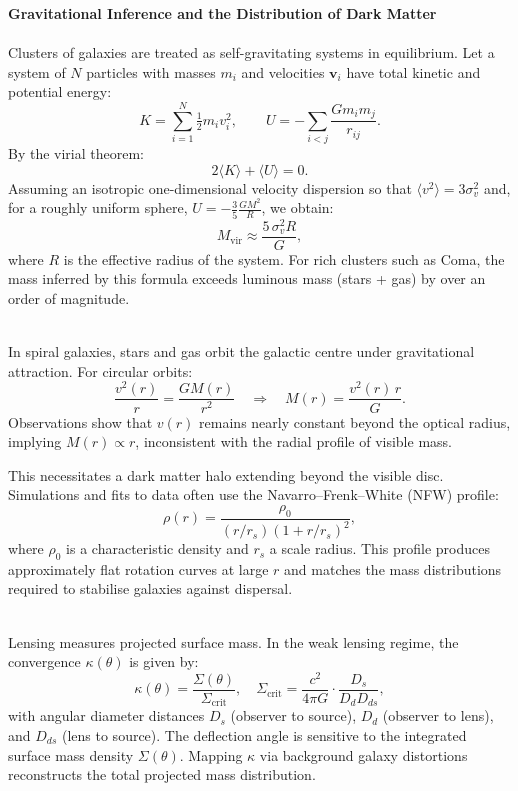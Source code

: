 \begin{technical}
{\Large\textbf{Gravitational Inference and the Distribution of Dark Matter}}\\[0.3em]

\\[0.25em]
Clusters of galaxies are treated as self-gravitating systems in equilibrium. Let a system of \( N \) particles with masses \( m_i \) and velocities \( \mathbf{v}_i \) have total kinetic and potential energy:
\[
K = \sum_{i=1}^N \tfrac{1}{2} m_i v_i^2, \qquad
U = - \sum_{i<j} \frac{G m_i m_j}{r_{ij}}.
\]
By the virial theorem:
\[
2\langle K \rangle + \langle U \rangle = 0.
\]
Assuming an isotropic one-dimensional velocity dispersion so that \( \langle v^2 \rangle = 3\sigma_v^2 \) and, for a roughly uniform sphere, \( U = - \tfrac{3}{5}\tfrac{G M^2}{R} \), we obtain:
\[
M_{\text{vir}} \approx \frac{5\,\sigma_v^2 R}{G},
\]
where \( R \) is the effective radius of the system. For rich clusters such as Coma, the mass inferred by this formula exceeds luminous mass (stars + gas) by over an order of magnitude.

\\[0.25em]
In spiral galaxies, stars and gas orbit the galactic centre under gravitational attraction. For circular orbits:
\[
\frac{v^2(r)}{r} = \frac{G M(r)}{r^2} \quad \Rightarrow \quad M(r) = \frac{v^2(r)\,r}{G}.
\]
Observations show that \( v(r) \) remains nearly constant beyond the optical radius, implying \( M(r) \propto r \), inconsistent with the radial profile of visible mass.

This necessitates a dark matter halo extending beyond the visible disc. Simulations and fits to data often use the Navarro–Frenk–White (NFW) profile:
\[
\rho(r) = \frac{\rho_0}{(r/r_s)(1 + r/r_s)^2},
\]
where \( \rho_0 \) is a characteristic density and \( r_s \) a scale radius. This profile produces approximately flat rotation curves at large \( r \) and matches the mass distributions required to stabilise galaxies against dispersal.

\\[0.25em]
Lensing measures projected surface mass. In the weak lensing regime, the convergence \( \kappa(\theta) \) is given by:
\[
\kappa(\theta) = \frac{\Sigma(\theta)}{\Sigma_{\text{crit}}}, \quad
\Sigma_{\text{crit}} = \frac{c^2}{4\pi G} \cdot \frac{D_s}{D_d D_{ds}},
\]
with angular diameter distances \( D_s \) (observer to source), \( D_d \) (observer to lens), and \( D_{ds} \) (lens to source). The deflection angle is sensitive to the integrated surface mass density \( \Sigma(\theta) \). Mapping \( \kappa \) via background galaxy distortions reconstructs the total projected mass distribution.


\end{technical}
